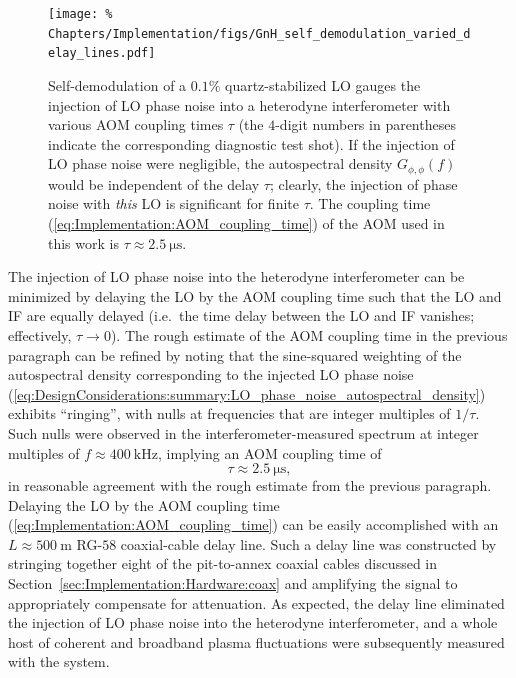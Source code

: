 \begin{figure}
  \centering
  \texttt{[image: \%
    Chapters/Implementation/figs/GnH\_self\_demodulation\_varied\_delay\_lines.pdf]}
  \caption[Self-demodulation of a $0.1\%$ quartz-stabilized LO]{%
    Self-demodulation of a $0.1\%$ quartz-stabilized LO
    gauges the injection of LO phase noise
    into a heterodyne interferometer
    with various AOM coupling times $\tau$
    (the $4$-digit numbers in parentheses indicate
    the corresponding diagnostic test shot).
    If the injection of LO phase noise were negligible,
    the autospectral density $G_{\phi,\phi}(f)$
    would be independent of the delay $\tau$;
    clearly, the injection of phase noise with \emph{this} LO
    is significant for finite $\tau$.
    The coupling time (\ref{eq:Implementation:AOM_coupling_time})
    of the AOM used in this work is
    $\tau \approx \SI{2.5}{\micro\second}$.
  }
\label{fig:Implementation:GnH_self_demodulation}
\end{figure}

The injection of LO phase noise into the heterodyne interferometer
can be minimized by delaying the LO by the AOM coupling time
such that the LO and IF are equally delayed
(i.e.\ the time delay between the LO and IF vanishes;
effectively, $\tau \rightarrow 0$).
The rough estimate of the AOM coupling time in the previous paragraph
can be refined by noting that the sine-squared weighting
of the autospectral density corresponding to the injected LO phase noise
(\ref{eq:DesignConsiderations:summary:LO_phase_noise_autospectral_density})
exhibits ``ringing'', with nulls at
frequencies that are integer multiples of $1 / \tau$.
Such nulls were observed in the interferometer-measured spectrum
at integer multiples of $f \approx \SI{400}{\kilo\hertz}$,
implying an AOM coupling time of
\begin{equation}
  \tau \approx \SI{2.5}{\micro\second},
  \label{eq:Implementation:AOM_coupling_time}
\end{equation}
in reasonable agreement with the rough estimate
from the previous paragraph.
Delaying the LO by the AOM coupling time
(\ref{eq:Implementation:AOM_coupling_time})
can be easily accomplished with
an $L \approx \SI{500}{\meter}$ {RG-$58$} coaxial-cable delay line.
Such a delay line was constructed by
stringing together eight of the pit-to-annex coaxial cables discussed in
Section~\ref{sec:Implementation:Hardware:coax} and
amplifying the signal to appropriately compensate for attenuation.
As expected, the delay line eliminated the injection of LO phase noise
into the heterodyne interferometer, and
a whole host of coherent and broadband plasma fluctuations
were subsequently measured with the system.


